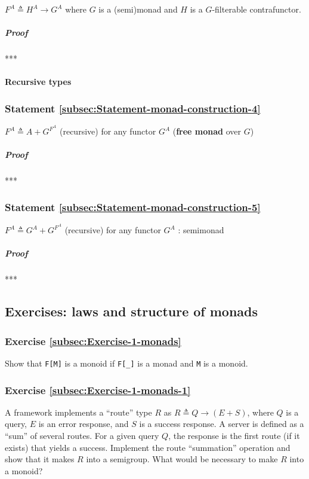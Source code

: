 $F^{A}\triangleq H^{A}\rightarrow G^{A}$ where $G$ is a (semi)monad
and $H$ is a $G$-filterable contrafunctor.

\subparagraph{Proof}

{*}{*}{*}


\paragraph{Recursive types}

\subsubsection{Statement \label{subsec:Statement-monad-construction-4}\ref{subsec:Statement-monad-construction-4}}

$F^{A}\triangleq A+G^{F^{A}}$ (recursive) for any functor $G^{A}$
(\textbf{free monad} over $G$)

\subparagraph{Proof}

{*}{*}{*}

\subsubsection{Statement \label{subsec:Statement-monad-construction-5}\ref{subsec:Statement-monad-construction-5}}

$F^{A}\triangleq G^{A}+G^{F^{A}}$ (recursive) for any functor $G^{A}$
: semimonad

\subparagraph{Proof}

{*}{*}{*}

\subsection{Exercises: laws and structure of monads}

\subsubsection{Exercise \label{subsec:Exercise-1-monads}\ref{subsec:Exercise-1-monads}}

Show that \lstinline!F[M]! is a monoid if \lstinline!F[_]! is a
monad and \lstinline!M! is a monoid.

\subsubsection{Exercise \label{subsec:Exercise-1-monads-1}\ref{subsec:Exercise-1-monads-1}}

A framework implements a \textsf{``}route\textsf{''} type $R$ as $R\triangleq Q\rightarrow\left(E+S\right)$,
where $Q$ is a query, $E$ is an error response, and $S$ is a success
response. A server is defined as a \textsf{``}sum\textsf{''} of several routes. For
a given query $Q$, the response is the first route (if it exists)
that yields a success. Implement the route \textsf{``}summation\textsf{''} operation
and show that it makes $R$ into a semigroup. What would be necessary
to make $R$ into a monoid?

